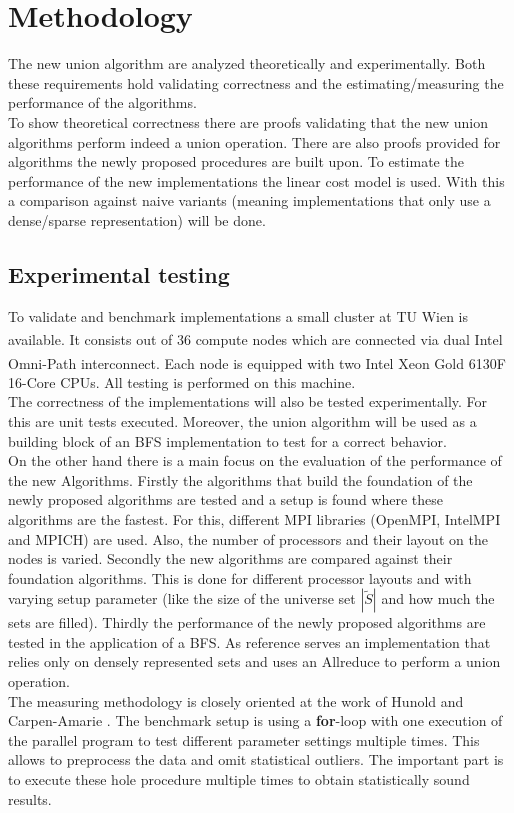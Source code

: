 \documentclass[a4paper,%
	12pt,%
	DIV14,
	headsepline,%
	headings=normal,
]{scrartcl}
\theoremstyle{definition}
\theoremstyle{remark}
\begin{document}
\section{Methodology}
The new union algorithm are analyzed theoretically and experimentally. Both these requirements hold validating correctness and the estimating/measuring the performance of the algorithms. \\
To show theoretical correctness there are proofs validating that the new union algorithms perform indeed a union operation. There are also proofs provided for algorithms the newly proposed procedures are built upon. To estimate the performance of the new implementations the linear cost model is used. With this a comparison against naive variants (meaning implementations that only use a dense/sparse representation) will be done.\\
\subsection{Experimental testing}
To validate and benchmark implementations a small cluster at TU Wien is available. It consists out of 36 compute nodes which are connected via dual Intel\textsuperscript{\textregistered} Omni-Path interconnect. Each node is equipped with two Intel\textsuperscript{\textregistered} Xeon\textsuperscript{\textregistered} Gold 6130F 16-Core CPUs. All testing is performed on this machine.\\
The correctness of the implementations will also be tested experimentally. For this are unit tests executed. Moreover, the union algorithm will be used as a building block of an BFS implementation to test for a correct behavior.\\
On the other hand there is a main focus on the evaluation of the performance of the new Algorithms.
Firstly the algorithms that build the foundation of the newly proposed algorithms are tested and a setup is found where these algorithms are the fastest. For this, different MPI libraries (OpenMPI, IntelMPI and MPICH) are used. Also, the number of processors and their layout on the nodes is varied. Secondly the new algorithms are compared against their foundation algorithms. This is done for different processor layouts and with varying setup parameter (like the size of the universe set $|\tilde{S}|$ and how much the sets are filled). Thirdly the performance of the newly proposed algorithms are tested in the application of a BFS. As reference serves an implementation that relies only on densely represented sets and uses an Allreduce to perform a union operation.\\
The measuring methodology is closely oriented at the work of Hunold and Carpen-Amarie \cite{HunoldBench}. The benchmark setup is using a \textbf{for}-loop with one execution of the parallel program to test different parameter settings multiple times. This allows to preprocess
the data and omit statistical outliers. The important part is to execute these hole procedure multiple times to obtain statistically sound results.
\end{document}
